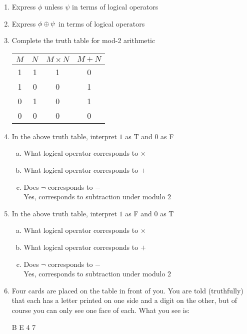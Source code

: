 \documentclass[]{article}
\begin{document}
\begin{enumerate}
	\item Express $\phi$ unless $\psi$ in terms of logical operators
		\answerbox{$\phi \Leftrightarrow \psi$}
	\setcounter{enumi}{2}
	\item Express $\phi \oplus \psi$ in terms of logical operators 
		\answerbox{$(\phi \wedge \neg \psi) \vee (\neg \phi \wedge \psi)$}
	\setcounter{enumi}{4}
	\item Complete the truth table for mod-2 arithmetic \\
		\begin{center} \begin{tabular}{c c | c c}
			$M$ & $N$ & $M \times N$ & $M + N$ \\ \hline
			1 & 1 & 1 & 0 \\
			1 & 0 & 0 & 1 \\
			0 & 1 & 0 & 1 \\
			0 & 0 & 0 & 0
		 \end{tabular} \end{center}
	\item In the above truth table, interpret $1$ as T and $0$ as F
	\begin{enumerate}[(a)]
		\item What logical operator corresponds to $\times$
		\item What logical operator corresponds to $+$
		\item Does $\neg$ corresponds to $-$ \\
			\hspace*{\fill} Yes, corresponds to subtraction under modulo $2$ 
	\end{enumerate}
		\item In the above truth table, interpret $1$ as F and $0$ as T
	\begin{enumerate}[(a)]
		\item What logical operator corresponds to $\times$
		\item What logical operator corresponds to $+$
		\item Does $\neg$ corresponds to $-$ \\
			\hspace*{\fill} Yes, corresponds to subtraction under modulo $2$ 
	\end{enumerate}
	\item Four cards are placed on the table in front of you. You are told (truthfully) that each has a letter printed on one side and a digit on the other, but of course you can only see one face of each. What you see is: \begin{center} B E 4 7 \end{center}

\end{enumerate}
\end{document}
